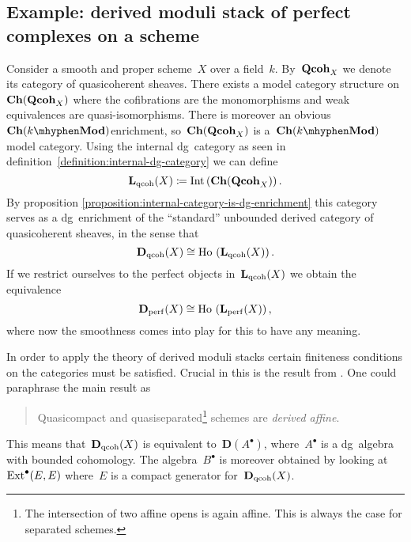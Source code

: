 \begin{refsection}
\section{Example: derived moduli stack of perfect complexes on a scheme}
\label{section:example}
Consider a smooth and proper scheme~$X$ over a field~$k$. By~$\mathbf{Qcoh}_X$ we denote its category of quasicoherent sheaves. There exists a model category structure on~$\mathbf{Ch}(\mathbf{Qcoh}_X)$ where the cofibrations are the monomorphisms and weak equivalences are quasi-isomorphisms. There is moreover an obvious~$\Ch(k\mhyphen\Mod)$\dash enrichment, so~$\mathbf{Ch}(\mathbf{Qcoh}_X)$ is a~$\Ch(k\mhyphen\Mod)$\dash model category. Using the internal dg~category as seen in definition~\ref{definition:internal-dg-category} we can define
\begin{equation}
  \mathbf{L}_{\mathrm{qcoh}}(X)\coloneqq\operatorname{Int}\left( \mathbf{Ch}(\mathbf{Qcoh}_X) \right).
\end{equation}
By proposition \ref{proposition:internal-category-is-dg-enrichment} this category serves as a dg~enrichment of the ``standard'' unbounded derived category of quasicoherent sheaves, in the sense that
\begin{equation}
  \mathbf{D}_{\mathrm{qcoh}}(X)\cong\operatorname{\mathrm{Ho} \,}\left( \mathbf{L}_{\mathrm{qcoh}}(X) \right).
\end{equation}
If we restrict ourselves to the perfect objects in~$\mathbf{L}_{\mathrm{qcoh}}(X)$ we obtain the equivalence
\begin{equation}
  \mathbf{D}_{\mathrm{perf}}(X)\cong\operatorname{\mathrm{Ho} \,}\left( \mathbf{L}_{\mathrm{perf}}(X) \right),
\end{equation}
where now the smoothness comes into play for this to have any meaning.

In order to apply the theory of derived moduli stacks certain finiteness conditions on the categories must be satisfied. Crucial in this is the result from \cite{bondal-vandenbergh}. One could paraphrase the main result as
\begin{quote}
  Quasicompact and quasiseparated\footnote{The intersection of two affine opens is again affine. This is always the case for separated schemes.} schemes are \emph{derived affine}.
\end{quote}
\begin{flushright}
  \cite[corollary 3.1.8]{bondal-vandenbergh}
\end{flushright}
This means that~$\mathbf{D}_{\mathrm{qcoh}}(X)$ is equivalent to~$\mathbf{D}(A^\bullet)$, where~$A^\bullet$ is a dg~algebra with bounded cohomology. The algebra~$B^\bullet$ is moreover obtained by looking at~$\mathrm{Ext}^\bullet(E,E)$ where~$E$ is a compact generator for~$\mathbf{D}_{\mathrm{qcoh}}(X)$.


\end{refsection}
